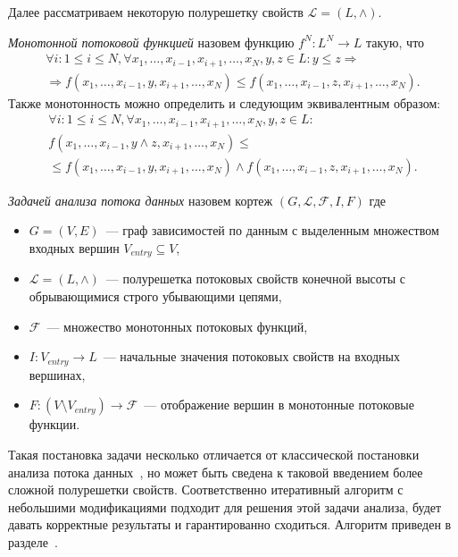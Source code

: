 \documentclass[14pt,titlepage,draft]{extarticle}
\newcommand{\Lattice}{\mathcal{L}}
\newcommand{\meet}{\wedge}
\begin{document}
    Далее рассматриваем некоторую полурешетку свойств $\Lattice = (L, \meet)$.

    \emph{Монотонной потоковой функцией} назовем функцию $f^N \colon L^N \to L$
    такую, что
    \begin{gather*}
      \forall i\colon 1 \leq i \leq N,
      \forall x_1, \ldots, x_{i-1}, x_{i+1}, \ldots, x_N, y, z \in L \colon
        y \leq z \Rightarrow \\
        \Rightarrow
        f(x_1, \ldots, x_{i-1}, y, x_{i+1}, \ldots, x_N) \leq
        f(x_1, \ldots, x_{i-1}, z, x_{i+1}, \ldots, x_N).
    \end{gather*}
    Также монотонность можно определить и следующим эквивалентным образом:
    \begin{gather*}
      \forall i\colon 1 \leq i \leq N,
      \forall x_1, \ldots, x_{i-1}, x_{i+1}, \ldots, x_N, y, z \in L \colon \\
        f(x_1, \ldots, x_{i-1}, y \meet z, x_{i+1}, \ldots, x_N) \leq \\
        \leq
        f(x_1, \ldots, x_{i-1}, y,         x_{i+1}, \ldots, x_N) \meet
        f(x_1, \ldots, x_{i-1}, z,         x_{i+1}, \ldots, x_N).
    \end{gather*}

    \emph{Задачей анализа потока данных} назовем кортеж $(G, \Lattice,
    \mathcal{F}, I, F)$ где
    \begin{itemize}
      \item $G = (V, E)$~--- граф зависимостей по данным с выделенным
            множеством входных вершин $V_{entry} \subseteq V$,
      \item $\Lattice = (L, \meet)$~--- полурешетка потоковых свойств конечной
            высоты с обрывающимися строго убывающими цепями,
      \item $\mathcal{F}$~--- множество монотонных потоковых функций,
      \item $I\colon V_{entry} \to L$~--- начальные значения потоковых свойств
            на входных вершинах,
      \item $F\colon (V \setminus V_{entry}) \to \mathcal{F}$~--- отображение
            вершин в монотонные потоковые функции.
    \end{itemize}

    Такая постановка задачи несколько отличается от классической постановки
    анализа потока данных~\cite{muchnick, nielson}, но может быть сведена к
    таковой введением более сложной полурешетки свойств.
    Соответственно итеративный алгоритм с небольшими модификациями подходит для
    решения этой задачи анализа, будет давать корректные результаты и
    гарантированно сходиться. Алгоритм приведен в разделе~\todoref.
\end{document}
